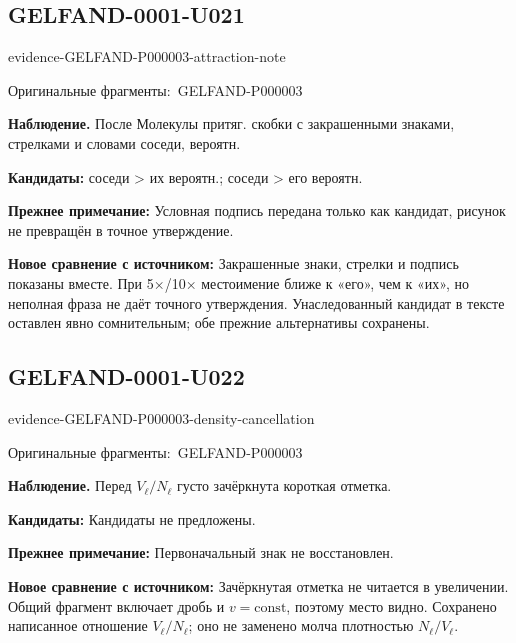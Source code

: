 \documentclass[11pt]{article}
\newcommand{\EvidenceBlock}[4]{%
 \par\smallskip\noindent\begin{minipage}{\linewidth}
 \begin{minipage}[t]{.47\linewidth}\vspace{0pt}\centering
 \csname evidence-#1-#2\endcsname\par
 {\scriptsize\SourceCropCaption\ #1}\par
 \end{minipage}\hfill
 \begin{minipage}[t]{.49\linewidth}\vspace{0pt}\raggedright
 {\small\color{orange!65!black}\textbf{#4} #3}\par
 \end{minipage}
 \end{minipage}\par\smallskip}
\newcommand{\SourceCropCaption}{Оригинальные фрагменты:}\newcommand{\ReadingCaption}{Сомнительное чтение.}\newcommand{\IncompleteCaption}{Неразобранный фрагмент.}\newcommand{\DiagramCaption}{Рисунок и набранное описание.}
\begin{document}
\subsection*{GELFAND-0001-U021}
\EvidenceBlock{GELFAND-P000003}{attraction-note}{После Молекулы притяг. скобки с закрашенными знаками, стрелками и словами соседи, вероятн.}{Наблюдение.}
\par\smallskip\noindent\textbf{Кандидаты: } соседи > их вероятн.; соседи > его вероятн.\par
\par\smallskip\noindent\textbf{Прежнее примечание: } Условная подпись передана только как кандидат, рисунок не превращён в точное утверждение.\par
\par\smallskip\noindent\textbf{Новое сравнение с источником: } Закрашенные знаки, стрелки и подпись показаны вместе. При 5×/10× местоимение ближе к «его», чем к «их», но неполная фраза не даёт точного утверждения. Унаследованный кандидат в тексте оставлен явно сомнительным; обе прежние альтернативы сохранены.\par

\subsection*{GELFAND-0001-U022}
\EvidenceBlock{GELFAND-P000003}{density-cancellation}{Перед \(V_\ell/N_\ell\) густо зачёркнута короткая отметка.}{Наблюдение.}
\par\smallskip\noindent\textbf{Кандидаты: } Кандидаты не предложены.\par
\par\smallskip\noindent\textbf{Прежнее примечание: } Первоначальный знак не восстановлен.\par
\par\smallskip\noindent\textbf{Новое сравнение с источником: } Зачёркнутая отметка не читается в увеличении. Общий фрагмент включает дробь и \(v=\mathrm{const}\), поэтому место видно. Сохранено написанное отношение \(V_\ell/N_\ell\); оно не заменено молча плотностью \(N_\ell/V_\ell\).\par
\end{document}
